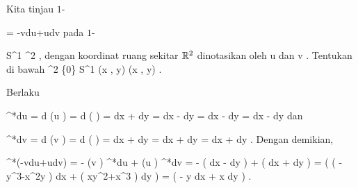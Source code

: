 {

Kita tinjau
$1$-

\mavergleichskettedisp
{\vergleichskette
{ \omega
}
{ =} { -vdu+udv
}
{ } {
}
{ } {
}
{ } {
}
}
{}{}{}
pada
$1$-

\mavergleichskette
{\vergleichskette
{ S^1
}
{ \subset }{ \R^2
}
{  }{
}
{    }{
}
{   }{
}
}
{}{}{,}
dengan koordinat ruang sekitar ${\mathbb R}^2$ dinotasikan oleh
\mathkor {} {u} {dan} {v} {.}
Tentukan
\mathl{\pi^* \omega}{} di bawah
\maabbeledisp {\pi} {\R^2 \setminus \{0\}} { S^{1}
} {(x , y) } { {  } (x , y)
} {.}

}
{

Berlaku

\mavergleichskettealign
{\vergleichskettealign
{ \pi^*du
}
{ =} { d (u \circ \pi)
}
{ =} { d   \left(  {  }  \right)
}
{ =} { {  }   dx + {  } dy
}
{ =} { {  }  dx   - {  }  dy
}
}
{
\vergleichskettefortsetzungalign
{ =} { {  }  dx  - {  }  dy
}
{ =} { {  }  dx  - {  }  dy
}
{ } {}
{ } {}
}
{}{}
dan

\mavergleichskettealign
{\vergleichskettealign
{ \pi^*dv
}
{ =} { d (v \circ \pi)
}
{ =} { d \left(  {  }  \right)
}
{ =} { {  } dx + {  } dy
}
{ =} { {  } dx + {  } dy
}
}
{
\vergleichskettefortsetzungalign
{ =} { {  } dx + {  }  dy
}
{ } {
}
{ } {}
{ } {}
}
{}{.}
Dengan demikian,

\mavergleichskettealigndrucklinks
{\vergleichskettealigndrucklinks
{ \pi^*(-vdu+udv)
}
{ =} { - (v \circ \pi)  \pi^*du + (u \circ \pi) \pi^*dv
}
{ =} { - {  } \left(  {  }  dx  - {  }  dy   \right) + {  }  \left(  {  } dx + {  } dy  \right)
}
{ =} { {  }  \left(  \left(  -y^3-x^2y  \right) dx + \left(  xy^2+x^3  \right) dy \right)
}
{ =} { {  }  \left(  -  y dx + x dy \right)
}
}
{}{}{.}

 }



